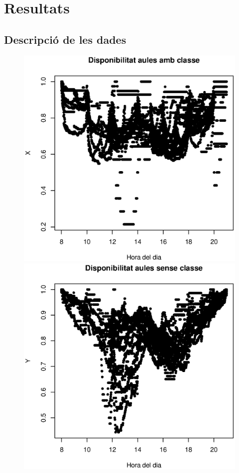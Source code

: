 \section{Resultats}
\captionsetup[figure]{labelsep=space}
\subsection{Descripció de les dades}

\begin{figure}[h!]
\centering
\begin{minipage}{0.45\linewidth}
\includegraphics[width=1\linewidth]{./images/dades_X.eps}
\end{minipage}
\hfill
\begin{minipage}{0.45\linewidth}
\includegraphics[width=1\linewidth]{./images/dades_Y.eps}
\end{minipage}
\end{figure}


